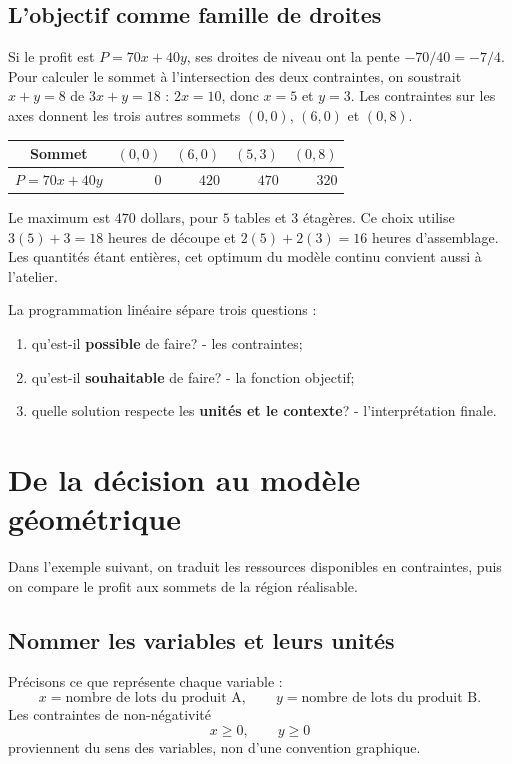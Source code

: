 \subsection{L'objectif comme famille de droites}
Si le profit est $P=70x+40y$, ses droites de niveau ont la pente $-70/40=-7/4$.
Pour calculer le sommet à l'intersection des deux contraintes, on soustrait
$x+y=8$ de $3x+y=18$ : $2x=10$, donc $x=5$ et $y=3$.
Les contraintes sur les axes donnent les trois autres sommets $(0,0)$, $(6,0)$ et $(0,8)$.
\begin{center}
\begin{tabular}{c|rrrr}
Sommet & $(0,0)$ & $(6,0)$ & $(5,3)$ & $(0,8)$\\\hline
$P=70x+40y$ & $0$ & $420$ & $470$ & $320$
\end{tabular}
\end{center}
Le maximum est $470$ dollars, pour $5$ tables et $3$ étagères. Ce choix utilise
$3(5)+3=18$ heures de découpe et $2(5)+2(3)=16$ heures d'assemblage.
Les quantités étant entières, cet optimum du modèle continu convient aussi à l'atelier.

\begin{connectionbox}
La programmation linéaire sépare trois questions :
\begin{enumerate}
\item qu'est-il \textbf{possible} de faire? - les contraintes;
\item qu'est-il \textbf{souhaitable} de faire? - la fonction objectif;
\item quelle solution respecte les \textbf{unités et le contexte}? - l'interprétation finale.
\end{enumerate}
\end{connectionbox}


\section{De la décision au modèle géométrique}
\label{manual:section:13.07}

Dans l'exemple suivant, on traduit les ressources disponibles en contraintes, puis on compare le profit aux sommets de la région réalisable.

\subsection{Nommer les variables et leurs unités}

Précisons ce que représente chaque variable :
\[
x=\text{nombre de lots du produit A},
\qquad
 y=\text{nombre de lots du produit B}.
\]
Les contraintes de non-négativité
\[
x\geq0,
\qquad y\geq0
\]
proviennent du sens des variables, non d'une convention graphique.

